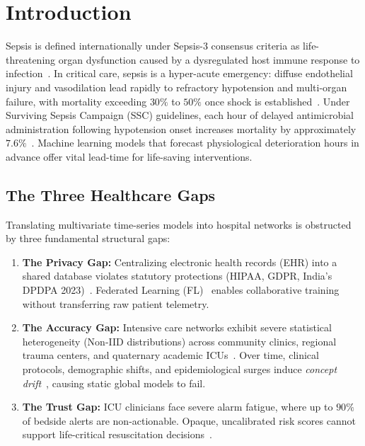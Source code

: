 \documentclass[10pt,a4paper,twocolumn,twoside]{article}
\begin{document}
\section{Introduction}
Sepsis is defined internationally under Sepsis-3 consensus criteria as life-threatening organ dysfunction caused by a dysregulated host immune response to infection~\cite{singer2016sepsis3}. In critical care, sepsis is a hyper-acute emergency: diffuse endothelial injury and vasodilation lead rapidly to refractory hypotension and multi-organ failure, with mortality exceeding $30\%$ to $50\%$ once shock is established~\cite{evans2021surviving}. Under Surviving Sepsis Campaign (SSC) guidelines, each hour of delayed antimicrobial administration following hypotension onset increases mortality by approximately $7.6\%$~\cite{evans2021surviving}. Machine learning models that forecast physiological deterioration hours in advance offer vital lead-time for life-saving interventions.

\subsection{The Three Healthcare Gaps}
Translating multivariate time-series models into hospital networks is obstructed by three fundamental structural gaps:
\begin{enumerate}
    \item \textbf{The Privacy Gap:} Centralizing electronic health records (EHR) into a shared database violates statutory protections (HIPAA, GDPR, India's DPDPA 2023)~\cite{rieke2020future,kaissis2020trustworthy}. Federated Learning (FL)~\cite{mcmahan2017} enables collaborative training without transferring raw patient telemetry.
    \item \textbf{The Accuracy Gap:} Intensive care networks exhibit severe statistical heterogeneity (Non-IID distributions) across community clinics, regional trauma centers, and quaternary academic ICUs~\cite{yuan2024trend,wang2025personalized}. Over time, clinical protocols, demographic shifts, and epidemiological surges induce \textit{concept drift}~\cite{jothimurugesan2022,bernardi2023adaptive}, causing static global models to fail.
    \item \textbf{The Trust Gap:} ICU clinicians face severe alarm fatigue, where up to $90\%$ of bedside alerts are non-actionable. Opaque, uncalibrated risk scores cannot support life-critical resuscitation decisions~\cite{lundberg2018explainable,sundararajan2017axiomatic}.
\end{enumerate}
\end{document}
